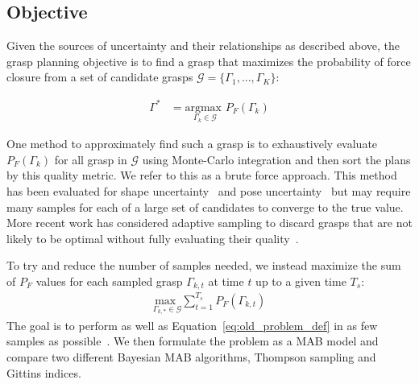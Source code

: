 \documentclass[10pt, conference]{ieeeconf}      %
\newcommand{\mG}{\mathcal{G}}
\begin{document}
\subsection{Objective}

Given the sources of uncertainty and their relationships as described above, the grasp planning objective is to find a grasp that maximizes the probability of force closure from a set of candidate grasps $\mG = \{\Gamma_1, ..., \Gamma_K\}$:

\vspace{-2ex}
\begin{align}
\Gamma^* &= \underset{\Gamma_k \in \mG}{\text{argmax }} P_F\left( \Gamma_k\right) \label{eq:old_problem_def}
\end{align}



One method to approximately find such a grasp is to exhaustively evaluate $P_F(\Gamma_k)$ for all grasp in $\mG$ using Monte-Carlo integration and then sort the plans by this quality metric.
We refer to this as a brute force approach. 
This method has been evaluated for shape uncertainty~\cite{christopoulos2007handling, kehoe2012estimating} and pose uncertainty~\cite{weisz2012pose} but may require many samples for each of a large set of candidates to converge to the true value.
More recent work has considered adaptive sampling to discard grasps that are not likely to be optimal without fully evaluating their quality~\cite{kehoe2012toward}.

To try and reduce the number of samples needed, we instead maximize the sum of $P_F$ values for each sampled grasp  $\Gamma_{k,t}$ at time $t$ up to a given time $T_s$:
\begin{align}
    \underset{\Gamma_{k,*} \in \mG}{\text{max }} \sum \limits_{t=1}^
    {T_s} P_F \left( \Gamma_{k,t}\right)  \label{eq:problem_def}
\end{align}
\noindent The goal is to perform as well as Equation~\ref{eq:old_problem_def} in as few samples as possible~\cite{srinivas2009gaussian}. We then formulate the  problem as a MAB model and compare two different Bayesian MAB algorithms, Thompson sampling and Gittins indices.
\end{document}
